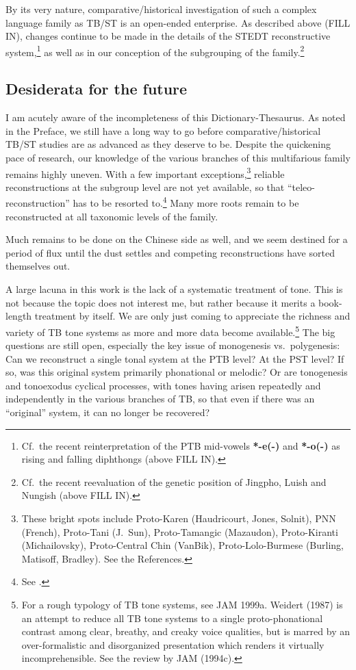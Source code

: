 By its very nature, comparative/historical investigation of such a complex language family as TB/ST is an open-ended enterprise. As described above (FILL IN), changes continue to be made in the details of the STEDT reconstructive system,\footnote{Cf.\ the recent reinterpretation of the PTB mid-vowels \textbf{*-e(-)} and \textbf{*-o(-)} as rising and falling diphthongs (above FILL IN).} as well as in our conception of the subgrouping of the family.\footnote{Cf.\ the recent reevaluation of the genetic position of Jingpho, Luish and Nungish (above FILL IN).}

\subsection{Desiderata for the future}

I am acutely aware of the incompleteness of this Dictionary-Thesaurus. As noted in the Preface, we still have a long way to go before comparative/historical TB/ST studies are as advanced as they deserve to be. Despite the quickening pace of research, our knowledge of the various branches of this multifarious family remains highly uneven. With a few important exceptions,\footnote{These bright spots include Proto-Karen (Haudricourt, Jones, Solnit), PNN (French), Proto-Tani (J.\ Sun), Proto-Tamangic (Mazaudon), Proto-Kiranti (Michailovsky), Proto-Central Chin (VanBik), Proto-Lolo-Burmese (Burling, Matisoff, Bradley). See the References.} reliable reconstructions at the subgroup level are not yet available, so that “teleo-reconstruction” has to be resorted to.\footnote{See \citealt{PKB-TBT}.} Many more roots remain to be reconstructed at all taxonomic levels of the family.

Much remains to be done on the Chinese side as well, and we seem destined for a period of flux until the dust settles and competing reconstructions have sorted themselves out.

A large lacuna in this work is the lack of a systematic treatment of tone. This is not because the topic does not interest me, but rather because it merits a book-length treatment by itself. We are only just coming to appreciate the richness and variety of TB tone systems as more and more data become available.\footnote{For a rough typology of TB tone systems, see JAM 1999a. Weidert (1987) is an attempt to reduce all TB tone systems to a single proto-phonational contrast among clear, breathy, and creaky voice qualities, but is marred by an over-formalistic and disorganized presentation which renders it virtually incomprehensible. See the review by JAM (1994c).} The big questions are still open, especially the key issue of monogenesis vs.\ polygenesis: Can we reconstruct a single tonal system at the PTB level? At the PST level? If so, was this original system primarily phonational or melodic? Or are tonogenesis and tonoexodus cyclical processes, with tones having arisen repeatedly and independently in the various branches of TB, so that even if there was an “original” system, it can no longer be recovered?

